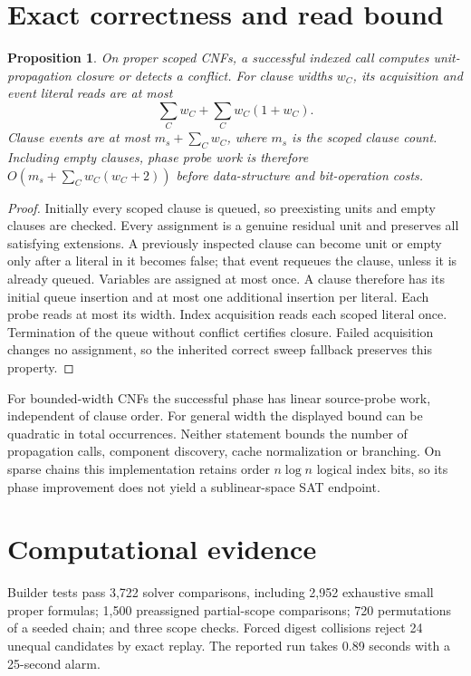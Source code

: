 \documentclass[11pt]{article}
\newtheorem{proposition}{Proposition}
\begin{document}
\section{Exact correctness and read bound}
\begin{proposition}
On proper scoped CNFs, a successful indexed call computes unit-propagation
closure or detects a conflict. For clause widths $w_C$, its acquisition
and event literal reads are at most
\[
 \sum_C w_C+\sum_C w_C(1+w_C).
\]
Clause events are at most $m_s+\sum_Cw_C$, where $m_s$ is the scoped
clause count. Including empty clauses, phase probe work is therefore
$O(m_s+\sum_C w_C(w_C+2))$ before data-structure and bit-operation costs.
\end{proposition}
\begin{proof}
Initially every scoped clause is queued, so preexisting units and empty
clauses are checked. Every assignment is a genuine residual unit and
preserves all satisfying extensions. A previously inspected clause can
become unit or empty only after a literal in it becomes false; that event
requeues the clause, unless it is already queued. Variables are assigned
at most once. A clause therefore has its initial queue insertion and at
most one additional insertion per literal. Each probe reads at most its
width. Index acquisition reads each scoped literal once. Termination of
the queue without conflict certifies closure. Failed acquisition changes
no assignment, so the inherited correct sweep fallback preserves this
property.
\end{proof}
For bounded-width CNFs the successful phase has linear source-probe work,
independent of clause order. For general width the displayed bound can be
quadratic in total occurrences. Neither statement bounds the number of
propagation calls, component discovery, cache normalization or branching.
On sparse chains this implementation retains order $n\log n$ logical
index bits, so its phase improvement does not yield a sublinear-space
SAT endpoint.

\section{Computational evidence}
Builder tests pass 3,722 solver comparisons, including 2,952 exhaustive
small proper formulas; 1,500 preassigned partial-scope comparisons;
720 permutations of a seeded chain; and three scope checks. Forced
digest collisions reject 24 unequal candidates by exact replay.
The reported run takes 0.89 seconds with a 25-second alarm.
\end{document}

